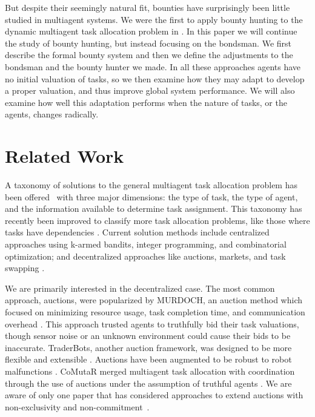 \documentclass[letterpaper]{aamas2015}
\newcommand\citen[1]{\hbox{\cite{#1}}}
\begin{document}
But despite their seemingly natural fit, bounties have surprisingly been little studied in multiagent systems.  We were the first to apply bounty hunting to the dynamic multiagent task allocation problem in \cite{Wicke:2015}.  In this paper we will continue the study of bounty hunting, but instead focusing on the bondsman.  We first describe the formal bounty system and then we define the adjustments to the bondsman and the bounty hunter we made.  In all these approaches agents have no initial valuation of tasks, so we then examine how they may adapt to develop a proper valuation, and thus improve global system performance.  We will also examine how well this adaptation performs when the nature of tasks, or the agents, changes radically.

\section{Related Work}

A taxonomy of solutions to the general multiagent task allocation problem has been offered~\cite{Gerkey:2004} with three major dimensions: the type of task, the type of agent, and the information available to determine task assignment.  This taxonomy has recently been improved to classify more task allocation problems, like those where tasks have dependencies \citen{Korsah:2013}.  Current solution methods include centralized approaches using k-armed bandits, integer programming, and combinatorial optimization; and decentralized approaches like auctions, markets, and task swapping \citen{Lagoudakis:2004,Liu:2014,Liu:2012,Nanjanath:2006}.


We are primarily interested in the decentralized case.  The most common approach, auctions, were popularized by MURDOCH, an auction method which focused on minimizing resource usage, task completion time, and communication overhead \citen{Gerkey2002c}.  
This approach trusted agents to truthfully bid their task valuations, though sensor noise or an unknown environment could cause their bids to be inaccurate.  TraderBots, another auction framework, was designed to be more flexible and extensible \citen{Dias:2004,Jones:2006}.  Auctions have been augmented to be robust to robot malfunctions \citen{Nanjanath:2010}.  CoMutaR merged  multiagent task allocation with coordination through the use of auctions under the assumption of truthful agents \citen{Shiroma:2009}.  We are aware of only one paper that has considered approaches to extend auctions with non-exclusivity and non-commitment~\cite{Mataric:2003}.
\end{document}
